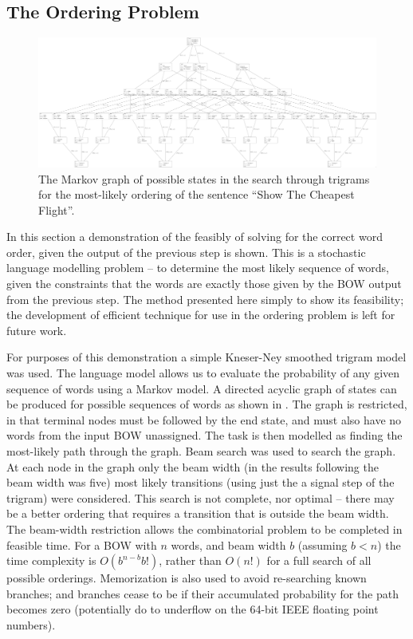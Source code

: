 \documentclass[]{scrartcl}
\numberwithin{equation}{section}
\numberwithin{figure}{section}
\theoremstyle{plain}
\theoremstyle{definition}
\begin{document}
\subsection{The Ordering Problem} \label{ordering}
\begin{figure}
	\centering 
	\includegraphics[scale=0.15]{markov_reordering2}
	\caption{The Markov graph of possible states in the search through trigrams for the most-likely ordering of the sentence 
		``Show The Cheapest Flight''.}
	\label{markov_diagram}
\end{figure}

In this section a demonstration of the feasibly of solving for the correct word order, given the output of the previous step is shown. This is a stochastic language modelling problem -- to determine the most likely sequence of words, given the constraints that the words are exactly those given by the BOW output from the previous step. The method presented here simply to show its feasibility; the development of efficient technique for use in the ordering problem is left for future work.


For purposes of this demonstration a simple Kneser-Ney smoothed trigram model \parencite{kneser1995improved} was used. The language model allows us to evaluate the probability of any given sequence of words using a Markov model.
A directed acyclic graph of states can be produced for possible sequences of words as shown in . The graph is restricted, in that terminal nodes must be followed by the end state, and must also have no words from the input BOW unassigned. The task is then modelled as finding the most-likely path through the graph.
Beam search was used to search the graph. At each node in the graph only the beam width (in the results following the beam width was five) most likely transitions (using just the a signal step of the trigram) were considered. This search is not complete, nor optimal -- there may be a better ordering that requires a transition that is outside the beam width. The beam-width restriction allows the combinatorial problem to be completed in feasible time. For a BOW with $n$ words, and beam width $b$ (assuming $b<n$) the time complexity is $O(b^{n-b}b!)$, rather than $O(n!)$ for a full search of all possible orderings. Memorization is also used to avoid re-searching known branches; and branches cease to be  if their accumulated probability for the path becomes zero (potentially do to underflow on the 64-bit IEEE floating point numbers).
\end{document}
